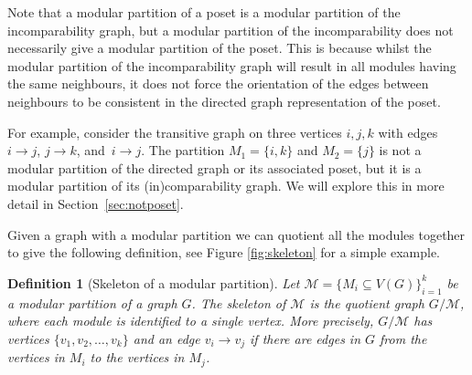 \documentclass[9pt,a4paper,oneside]{article}
\newtheorem{definition}[theorem]{Definition}
\newcommand{\cM}{\mathcal{M}}
\begin{document}
Note that a modular partition of a poset is a modular partition of the incomparability graph, but a modular partition of the incomparability does not necessarily give a modular partition of the poset.
 This is because whilst the modular partition of the incomparability graph will result in all modules having the same neighbours, it does not force the 
 orientation of the edges between neighbours to be consistent in the directed graph representation of the poset. 

For example, consider the transitive graph on three vertices $i,j,k$ with edges $i \to j$, $j\to k$, and~$i\to j$.  
The partition $M_1 =\{i,k\}$ and $M_2 =\{j\}$ is not a modular partition of the directed graph or its associated poset, but it is a modular partition of its (in)comparability graph.
We will explore this in more detail in Section~\ref{sec:notposet}.

Given a graph with a modular partition we can quotient all the modules together to give the following definition, see Figure \ref{fig:skeleton} for a simple example.

\begin{definition}[Skeleton of a modular partition]
Let $\cM=\{ M_i\subseteq V(G)\}_{i=1}^k$ be a modular partition of a graph $G$. The \emph{skeleton} of $\cM$ is the quotient graph $G/\cM$, where each module is identified to a single vertex.  More precisely, $G/\cM$ has vertices $\{v_1, v_2, \ldots, v_k\}$ and an edge $v_i \to v_j$ if there are edges in $G$ from the vertices in $M_i$ to the vertices in $M_j$.
\end{definition}
\end{document}
